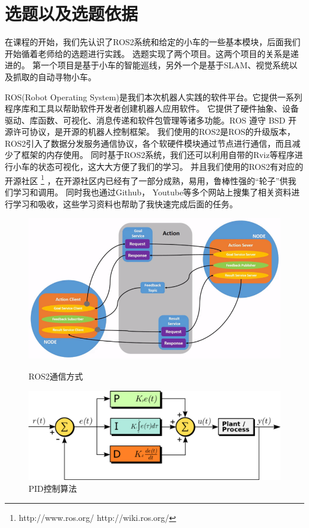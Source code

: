 \documentclass[a4paper,twoside]{article}
\begin{document}
\section{选题以及选题依据}
在课程的开始，我们先认识了ROS2系统和给定的小车的一些基本模块，后面我们开始循着老师给的选题进行实践。
选题实现了两个项目。这两个项目的关系是递进的。
第一个项目是基于小车的智能巡线，另外一个是基于SLAM、视觉系统以及抓取的自动寻物小车。

ROS(Robot Operating System)是我们本次机器人实践的软件平台。它提供一系列程序库和工具以帮助软件开发者创建机器人应用软件。
它提供了硬件抽象、设备驱动、库函数、可视化、消息传递和软件包管理等诸多功能。ROS 遵守 BSD 开源许可协议，是开源的机器人控制框架。
我们使用的ROS2是ROS的升级版本，ROS2引入了数据分发服务通信协议，各个软硬件模块通过节点进行通信，而且减少了框架的内存使用。
同时基于ROS2系统，我们还可以利用自带的Rviz等程序进行小车的状态可视化，这大大方便了我们的学习。
并且我们使用的ROS2有对应的开源社区 \footnote{ http://www.ros.org/ \quad http://wiki.ros.org/} ，在开源社区内已经有了一部分成熟，易用，鲁棒性强的“轮子”供我们学习和调用。
同时我也通过Github， Youtube等多个网站上搜集了相关资料进行学习和吸收，这些学习资料也帮助了我快速完成后面的任务。

\begin{figure}[htbp]
	\centering
	\begin{minipage}{0.49\linewidth}
		\centering
		\includegraphics[width=0.75\linewidth]{ros2character.png}
		\caption{ROS2通信方式}
		\label{chutian1}%
	\end{minipage}
	\begin{minipage}{0.49\linewidth}
		\centering
		\includegraphics[width=0.9\linewidth]{pidalgorithm.png}
		\caption{PID控制算法}
		\label{chutian2}%
	\end{minipage}
\end{figure}
\end{document}

